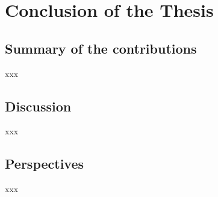\chapter{Conclusion of the Thesis}
\label{chapter:conlusion}
\localtableofcontents

\section{Summary of the contributions}
\label{section:ch12-summary_of_the_contributions}

xxx


\section{Discussion}
\label{section:ch12-discussion}

xxx


\section{Perspectives}
\label{section:ch12-perspectives}

xxx
